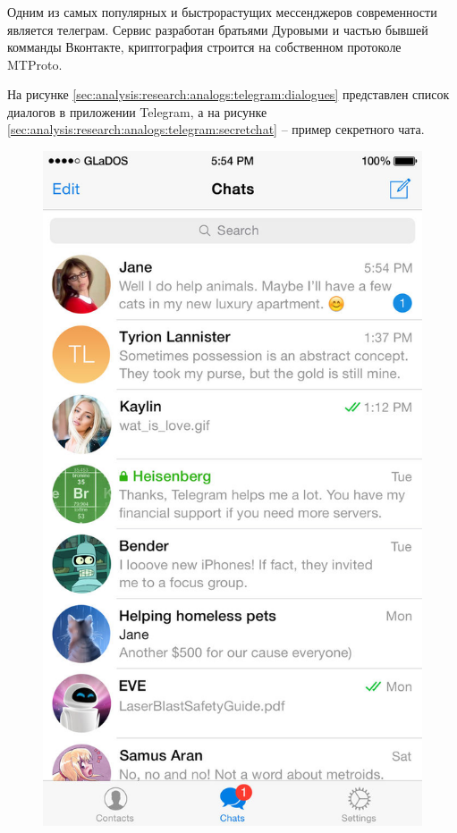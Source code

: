 \subsubsection{}
\label{sec:analysis:research:analogs:telegram}

Одним из самых популярных и быстрорастущих мессенджеров современности является телеграм. 
Сервис разработан братьями Дуровыми и частью бывшей комманды Вконтакте, криптография строится на собственном протоколе MTProto.

На рисунке \ref{sec:analysis:research:analogs:telegram:dialogues} представлен список диалогов в приложении Telegram, а на рисунке \ref{sec:analysis:research:analogs:telegram:secretchat} -- пример секретного чата.

\begin{figure}[h]
\centering
\begin{minipage}{.5\textwidth}
  \centering
  \includegraphics[width=.8\linewidth]{inc/img/tg-dialogues.jpg}

\end{minipage}
\end{figure}
